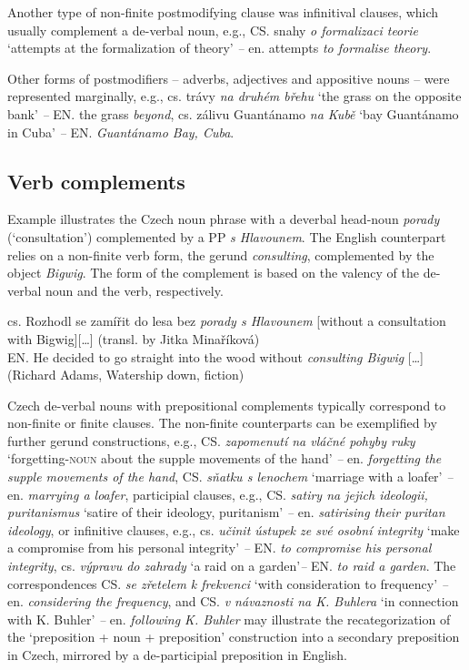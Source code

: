 \documentclass[output=paper]{langscibook}
\begin{document}
Another type of non-finite postmodifying clause was infinitival clauses, which usually complement a de-verbal noun, e.g., CS. snahy \textit{o formalizaci teorie} ‘attempts at the formalization of theory’ \textit{–} en. attempts \textit{to formalise theory}.

Other forms of postmodifiers – adverbs, adjectives and appositive nouns – were represented marginally, e.g., cs. trávy \textit{na druhém břehu} ‘the grass on the opposite bank’ \textit{–} EN. the grass \textit{beyond}, cs. zálivu Guantánamo \textit{na Kubě} ‘bay Guantánamo in Cuba’ \textit{–} EN. \textit{Guantánamo Bay, Cuba}.

\subsection{Verb complements}

Example  illustrates the Czech noun phrase with a deverbal head-noun \textit{porady} (‘consultation’) complemented by a PP \textit{s Hlavounem}. The English counterpart relies on a non-finite verb form, the gerund \textit{consulting}, complemented by the object \textit{Bigwig}. The form of the complement is based on the valency of the de-verbal noun and the verb, respectively.

\ea\label{ex:mala:8}
cs. Rozhodl se zamířit do lesa bez \textit{porady s Hlavounem} [without a consultation with Bigwig][…] (transl. by Jitka Minaříková)\\
EN. He decided to go straight into the wood without \textit{consulting Bigwig} […] (Richard Adams, Watership down, fiction)
\z

Czech de-verbal nouns with prepositional complements typically correspond to non-finite or finite clauses. The non-finite counterparts can be exemplified by further gerund constructions, e.g., CS. \textit{zapomenutí na vláčné pohyby ruky} ‘forgetting-\textsc{noun} about the supple movements of the hand’ \textit{–} en. \textit{forgetting the supple movements of the hand}, CS. \textit{sňatku s lenochem} ‘marriage with a loafer’ \textit{–} en. \textit{marrying a loafer}, participial clauses, e.g., CS. \textit{satiry na jejich ideologii, puritanismus} ‘satire of their ideology, puritanism’ \textit{–} en. \textit{satirising their puritan ideology}, or infinitive clauses, e.g., cs. \textit{učinit ústupek ze své osobní integrity} ‘make a compromise from his personal integrity’ \textit{–} EN. \textit{to compromise his personal integrity}, cs. \textit{výpravu do zahrady} ‘a raid on a garden’\textit{–} EN. \textit{to raid a garden}. The correspondences CS. \textit{se zřetelem k frekvenci} ‘with consideration to frequency’ \textit{–} en. \textit{considering the frequency}, and CS. \textit{v návaznosti na K. Buhlera} ‘in connection with K. Buhler’ \textit{–} en. \textit{following K. Buhler} may illustrate the recategorization of the ‘preposition + noun + preposition’ construction into a secondary preposition in Czech, mirrored by a de-participial preposition in English.
\end{document}
